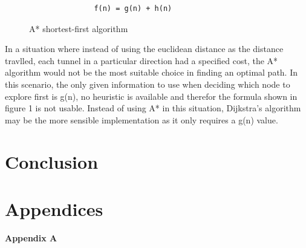 \documentclass[10pt, a4paper]{article}
\newcommand{\figuremacro}[5]{
    \begin{figure}[#1]
        \centering
        \texttt{[image: \#2]}
        \caption[#3]{\textbf{#3}#4}
        \label{fig:#2}
    \end{figure}
}
\begin{document}
\begin{figure}
\begin{verbatim}
               f(n) = g(n) + h(n)
\end{verbatim}
\caption{ A* shortest-first algorithm} \label{fig1}
\end{figure}

In a situation where instead of using the euclidean distance as the distance travlled, each tunnel in a particular direction had a specified cost, the A* algorithm would not be the most suitable choice in finding an optimal path. In this scenario, the only given information to use when deciding which node to explore first is  g(n), no heuristic is available and therefor the formula shown in figure 1 is not usable.
Instead of using A* in this situation, Dijkstra's algorithm may be the more sensible implementation as it only requires a g(n) value.





\section{Conclusion}












\noindent




\clearpage
\section*{Appendices}	
\textbf{Appendix A}
	        


		
\end{document}
